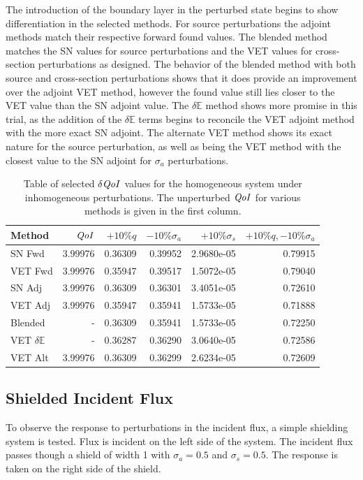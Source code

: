 \documentclass[12pt]{report}
\newcommand{\Edd}{\mathbb{E}}
\newcommand{\sigs}{\sigma_s}
\newcommand{\siga}{\sigma_a}
\newcommand{\qoi}{{\it QoI}\xspace}
\begin{document}
The introduction of the boundary layer in the perturbed state begins to show differentiation in the selected methods. For source perturbations the adjoint methods match their respective forward found values. The blended method matches the SN values for source perturbations and the VET values for cross-section perturbations as designed. The behavior of the blended method with both source and cross-section perturbations shows that it does provide an improvement over the adjoint VET method, however the found value still lies closer to the VET value than the SN adjoint value. The $\delta \Edd$ method shows more promise in this trial, as the addition of the $\delta \Edd$ terms begins to reconcile the VET adjoint method with the more exact SN adjoint. The alternate VET method shows its exact nature for the source perturbation, as well as being the VET method with the closest value to the SN adjoint for $\siga$ perturbations. 


\begin{table}[H]
\centering
  \begin{tabular}{| l | r || r | r | r | r |}
    \hline
    Method  & $\qoi$ & $+10\% q $  & $-10\% \siga $ & $+10\% \sigs $ & $+10\% q,-10\% \siga$ \\ \hline
     SN Fwd 			&3.99976	&0.36309 &0.39952 &2.9680e-05 & 0.79915\\ \hline
     VET Fwd			&3.99976	&0.35947 &0.39517 &1.5072e-05 &0.79040\\ \hline
     SN Adj  			&3.99976	&0.36309 &0.36301 &3.4051e-05 &0.72610\\ \hline
     VET Adj 			&3.99976	&0.35947 &0.35941 &1.5733e-05 &0.71888\\ \hline
     Blended 			&-			&0.36309 &0.35941 &1.5733e-05 &0.72250\\ \hline
     VET $\delta \Edd$ 	&-			&0.36287 &0.36290 &3.0640e-05 &0.72586\\ \hline
     VET Alt			&3.99976	&0.36309 &0.36299 &2.6234e-05 &0.72609\\ \hline
    \end{tabular}
  \caption{Table of selected $\delta \qoi$ values for the homogeneous system under inhomogeneous perturbations. The unperturbed $\qoi$ for various methods is given in the first column.}
\end{table}

\subsection{Shielded Incident Flux}
To observe the response to perturbations in the incident flux, a simple shielding system is tested. Flux is incident on the left side of the system. The incident flux passes though a shield of width 1 with $\siga=0.5$ and $\sigs=0.5$. The response is taken on the right side of the shield.
\end{document}
